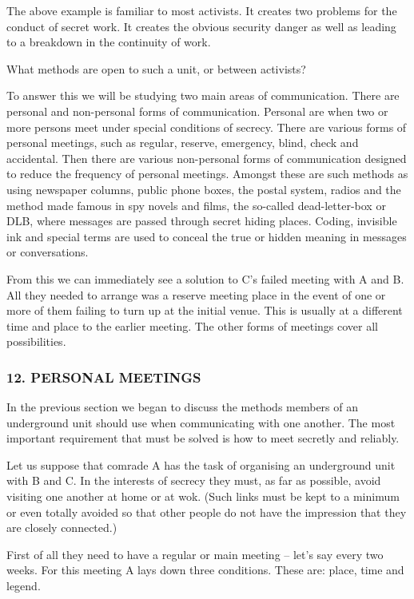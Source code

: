 The above example is familiar to most activists. It creates two problems
for the conduct of secret work. It creates the obvious security danger
as well as leading to a breakdown in the continuity of work.

What methods are open to such a unit, or between activists?

To answer this we will be studying two main areas of communication.
There are personal and non-personal forms of communication. Personal are
when two or more persons meet under special conditions of secrecy. There
are various forms of personal meetings, such as regular, reserve,
emergency, blind, check and accidental. Then there are various
non-personal forms of communication designed to reduce the frequency of
personal meetings. Amongst these are such methods as using newspaper
columns, public phone boxes, the postal system, radios and the method
made famous in spy novels and films, the so-called dead-letter-box or
DLB, where messages are passed through secret hiding places. Coding,
invisible ink and special terms are used to conceal the true or hidden
meaning in messages or conversations.

From this we can immediately see a solution to C's failed meeting with A
and B. All they needed to arrange was a reserve meeting place in the
event of one or more of them failing to turn up at the initial venue.
This is usually at a different time and place to the earlier meeting.
The other forms of meetings cover all possibilities.

\subsubsection{12. PERSONAL MEETINGS}

In the previous section we began to discuss the methods members of an
underground unit should use when communicating with one another. The
most important requirement that must be solved is how to meet secretly
and reliably.

Let us suppose that comrade A has the task of organising an underground
unit with B and C. In the interests of secrecy they must, as far as
possible, avoid visiting one another at home or at wok. (Such links must
be kept to a minimum or even totally avoided so that other people do not
have the impression that they are closely connected.)

First of all they need to have a regular or main meeting -- let's say
every two weeks. For this meeting A lays down three conditions. These
are: place, time and legend.

